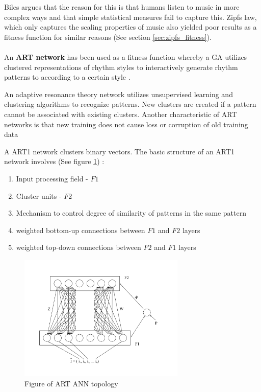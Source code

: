 Biles argues that the reason for this is that humans listen to music in more complex ways and that simple statistical measures fail to capture this. Zipfs law, which only captures the scaling properties of music also yielded poor results as a fitness function for similar reasons \cite{Dostal2013} (See section \ref{sec:zipfs_fitness}). 
\\
\\
An \textbf{\ac{ART} network} has been used as a fitness function whereby a \ac{GA} utilizes clustered representations of rhythm styles to interactively generate rhythm patterns to according to a certain style \cite{Burton97geneticalgorithm}.

An adaptive resonance theory network utilizes unsupervised learning and clustering algorithms to recognize patterns. New clusters are created if a pattern cannot be associated with existing clusters. Another characteristic of \ac{ART} networks is that new training does not cause loss or corruption of old training data \cite{carpenter2010adaptive}

A ART1 network clusters binary vectors. The basic structure of an ART1 network involves (See figure \ref{ims:ANN_art}) :
\begin{enumerate}
\item Input processing field - $F1$
\item Cluster units - $F2$
\item Mechanism to control degree of similarity of patterns in the same pattern
\item weighted bottom-up connections between $F1$ and $F2$ layers
\item weighted top-down connections between $F2$ and $F1$ layers
\end{enumerate}

\begin{figure}
\centering
\includegraphics[width=300px]{../images/ann_ART.png}
\caption{Figure of ART ANN topology}
\label{ims:ANN_art}
\end{figure}

